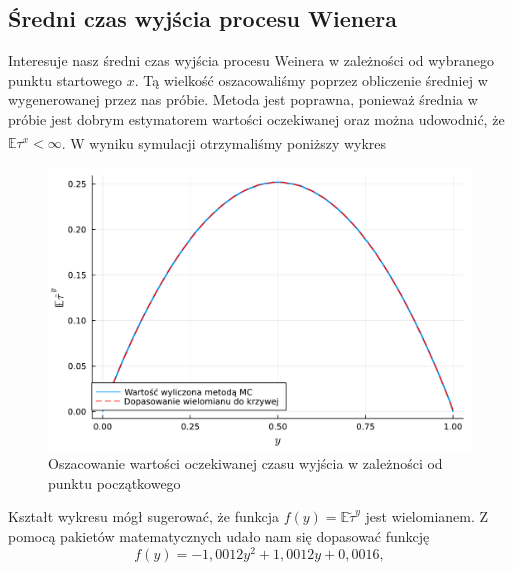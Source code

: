 \documentclass[12pt]{mwart}
\begin{document}
	
	\subsection{Średni czas wyjścia procesu Wienera}
	\noindent Interesuje nasz średni czas wyjścia procesu Weinera w zależności od wybranego punktu startowego $x$. Tą wielkość oszacowaliśmy poprzez obliczenie średniej w wygenerowanej przez nas próbie. Metoda jest poprawna, ponieważ średnia w próbie jest dobrym estymatorem wartości oczekiwanej oraz można udowodnić, że $\mathbb{E}\tau^x<\infty$\textsuperscript{\cite{art}}. W wyniku symulacji otrzymaliśmy poniższy wykres
	\begin{figure}[H]
		\includegraphics[width=\columnwidth]{fig/plot/expect_val.pdf}
		\caption{Oszacowanie wartości oczekiwanej czasu wyjścia w zależności od punktu początkowego}
	\end{figure}
	\noindent Kształt wykresu mógł sugerować, że funkcja $f(y)=\mathbb{E}\widetilde\tau^y$ jest wielomianem. Z pomocą pakietów matematycznych udało nam się dopasować funkcję 
	\begin{equation}\label{eq:oszac}
		f(y)=-1,0012y^2+1,0012y+0,0016,
	\end{equation}
\end{document}
